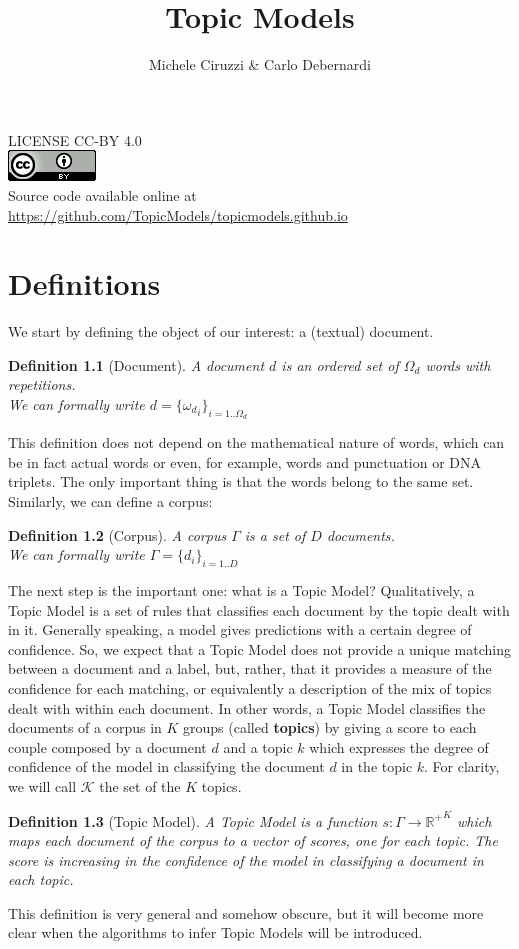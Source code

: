 \documentclass[11pt, a4paper, oneside, openright]{book}
\title{Topic Models}
\author{Michele Ciruzzi & Carlo Debernardi}
\newtheorem{definition}{Definition}
\begin{document}
\maketitle

LICENSE CC-BY 4.0 \\
\includegraphics{fig/cc-by}\\
Source code available online at \url{https://github.com/TopicModels/topicmodels.github.io}
\clearpage

\tableofcontents

\chapter{Definitions}

We start by defining the object of our interest: a (textual) document.
\begin{definition}[Document]
	\label{def:doc}
	A document $d$ is an ordered set of $\Omega_d$ words with repetitions. \\
	We can formally write $d = \{{\omega_d}_i\}_{i=1..\Omega_d}$
\end{definition}
This definition does not depend on the mathematical nature of words, which can be in fact actual words or even, for example, words and punctuation or DNA triplets. The only important thing is that the words belong to the same set. \\
Similarly, we can define a corpus:
\begin{definition}[Corpus]
	A corpus $\Gamma$ is a set of $D$ documents. \\
	We can formally write $\Gamma = \{d_i\}_{i=1..D}$
\end{definition}

The next step is the important one: what is a Topic Model?
Qualitatively, a Topic Model is a set of rules that classifies each document by the topic dealt with in it.
Generally speaking, a model gives predictions with a certain degree of confidence. 
So, we expect that a Topic Model does not provide a unique matching between a document and a label, but, rather, that it provides a measure of the confidence for each matching, or equivalently a description of the mix of topics dealt with within each document.
In other words, a Topic Model classifies the documents of a corpus in $K$ groups (called \textbf{topics}) by giving a score to each couple composed by a document $d$ and a topic $k$ which expresses the degree of confidence of the model in classifying the document $d$ in the topic $k$.
For clarity, we will call $\mathcal{K}$ the set of the $K$ topics.
\begin{definition}[Topic Model]
	\label{def:tm}
	A Topic Model is a function $s: \Gamma \rightarrow {\mathbb{R}^+}^K$ which maps each document of the corpus to a vector of scores, one for each topic. The score is increasing in the confidence of the model in classifying a document in each topic.
\end{definition}
This definition is very general and somehow obscure, but it will become more clear when the algorithms to infer Topic Models will be introduced.
\end{document}
